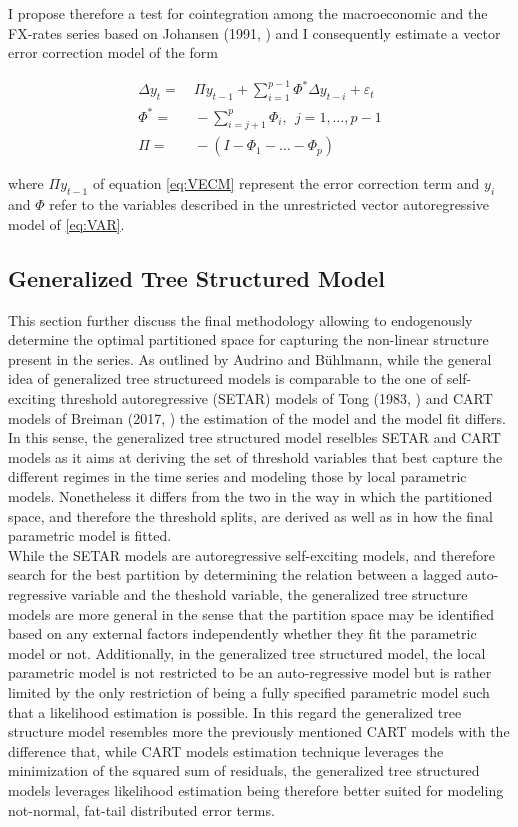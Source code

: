 I propose therefore a test for cointegration among the macroeconomic
and the FX-rates series based on Johansen (1991,
\cite{Johansen}) %
and I consequently estimate a vector error correction model of the
form

\begin{align}
  \Delta y_t =& \ \Pi y_{t-1} + \sum^{p-1}_{i=1} \Phi^{*} \Delta y_{t-i} + \varepsilon_t \nonumber\\
  \Phi^{*} =& \ - \sum^{p}_{i=j+1} \Phi_i, \ \  j = 1, \dots, p-1 \label{eq:VECM}\\
  \Pi =& \ -(I - \Phi_1 - \dots - \Phi_p) \nonumber\
\end{align}

where $\Pi y_{t-1}$ of equation \ref{eq:VECM} represent the error
correction term and $y_i$ and $\Phi$ refer to the variables described
in the unrestricted vector autoregressive model of \ref{eq:VAR}.

\subsection{Generalized Tree Structured Model}
\label{sub:GTS}

This section further discuss the final methodology allowing to
endogenously determine the optimal partitioned space for capturing the
non-linear structure present in the series. As outlined by Audrino and
B{\"u}hlmann, while the general idea of generalized tree structureed
models is comparable to the one of self-exciting threshold
autoregressive (SETAR) models of Tong (1983, \cite{SETAR_Tong}) and
CART models of Breiman (2017, \cite{Breiman}) the estimation of the
model and the model fit differs. In this sense, the generalized tree
structured model reselbles SETAR and CART models as it aims at
deriving the set of threshold variables that best capture the
different regimes in the time series and modeling those by local
parametric models. Nonetheless it differs from the two in the way in
which the partitioned space, and therefore the threshold splits, are
derived as well as in how the final parametric model is
fitted.\\
While the SETAR models are autoregressive self-exciting models, and
therefore search for the best partition by determining the relation
between a lagged auto-regressive variable and the theshold variable,
the generalized tree structure models are more general in the sense
that the partition space may be identified based on any external
factors independently whether they fit the parametric model or
not. Additionally, in the generalized tree structured model, the local
parametric model is not restricted to be an auto-regressive model but
is rather limited by the only restriction of being a fully specified
parametric model such that a likelihood estimation is possible. In
this regard the generalized tree structure model resembles more the
previously mentioned CART models with the difference that, while CART
models estimation technique leverages the minimization of the squared
sum of residuals, the generalized tree structured models leverages
likelihood estimation being therefore better suited for modeling
not-normal, fat-tail distributed error terms.

